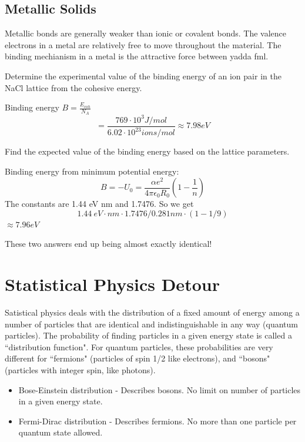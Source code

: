 \documentclass[class=article,crop=false]{standalone}
\begin{document}
\subsection{Metallic Solids}
Metallic bonds are generally weaker than ionic or covalent bonds. The valence electrons in a metal are relatively free to move throughout the material. The binding mechianism in a metal is the attractive force between yadda fml.

\newpage
\begin{question}
	Determine the experimental value of the binding energy of an ion pair in the NaCl lattice from the cohesive energy.
	\begin{answer}[A]
		Binding energy $B = \frac{E_{coh}}{N_A}$ \\
	$$ = \frac{769 \cdot 10^3 J/mol}{6.02 \cdot 10^{23} ions/mol} \approx 7.98 eV $$
	\end{answer}

	Find the expected value of the binding energy based on the lattice parameters.
	\begin{answer}[B]
		Binding energy from minimum potential energy:
		$$ B = -U_0 = \frac{\alpha e^2}{4\pi \epsilon_0 R_0} \left(1-\frac{1}{n}\right) $$
		The constants are 1.44 eV nm and 1.7476. So we get
		$$ 1.44\ eV \cdot nm \cdot 1.7476 /0.281 nm \cdot (1-1/9) $$
		$\approx 7.96 eV$
	\end{answer}

	These two answers end up being almost exactly identical!
\end{question}

\section{Statistical Physics Detour}
Satistical physics deals with the distribution of a fixed amount of energy among a number of particles that are identical and indistinguishable in any way (quantum particles). The probability of finding particles in a given energy state is called a ``distribution function". For quantum particles, these probabilities are very different for ``fermions" (particles of spin 1/2 like electrons), and ``bosons" (particles with integer spin, like photons). 
\begin{itemize}
	\item Bose-Einstein distribution - Describes bosons. No limit on number of particles in a given energy state.
	\item Fermi-Dirac distribution - Describes fermions. No more than one particle per quantum state allowed.
\end{itemize}
\end{document}

